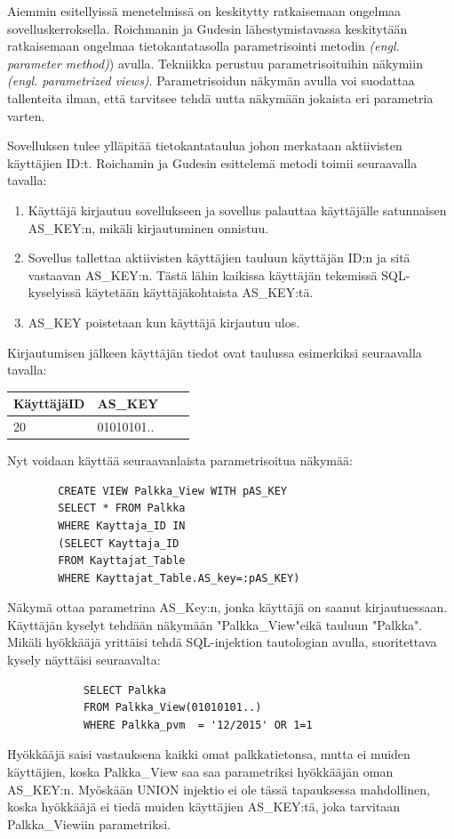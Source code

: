 \documentclass[finnish]{tktltiki2}
\theoremstyle{definition}
\theoremstyle{remark}
\begin{document}
		Aiemmin esitellyissä menetelmissä on keskitytty ratkaisemaan ongelmaa sovelluskerroksella. Roichmanin ja Gudesin lähestymistavassa keskitytään ratkaisemaan ongelmaa tietokantatasolla parametrisointi metodin \textit{(engl. parameter method)}) avulla. Tekniikka perustuu parametrisoituihin näkymiin \textit{(engl. parametrized views)}. Parametrisoidun näkymän avulla voi suodattaa tallenteita ilman, että tarvitsee tehdä uutta näkymään jokaista eri parametria varten.
		
		Sovelluksen tulee ylläpitää tietokantataulua johon merkataan aktiivisten käyttäjien ID:t. Roichamin ja Gudesin esittelemä metodi toimii seuraavalla tavalla:
		\begin{enumerate}
			\item Käyttäjä kirjautuu sovellukseen ja sovellus palauttaa käyttäjälle satunnaisen AS\_KEY:n, mikäli kirjautuminen onnistuu.
			
			\item Sovellus tallettaa aktiivisten käyttäjien tauluun käyttäjän ID:n ja sitä vastaavan AS\_KEY:n. Tästä lähin kaikissa käyttäjän tekemissä SQL-kyselyissä käytetään käyttäjäkohtaista AS\_KEY:tä.
			
			\item AS\_KEY poistetaan kun käyttäjä kirjautuu ulos.
		\end{enumerate}
		
		Kirjautumisen jälkeen käyttäjän tiedot ovat taulussa esimerkiksi seuraavalla tavalla:
	
		\begin{center}
		\begin{tabular}{| l | l | l | l |}
			\hline
			KäyttäjäID & AS\_KEY \\ \hline
			\hline
			20 &  01010101.. \\
			\hline
		\end{tabular}
		\end{center}
	

		Nyt voidaan käyttää seuraavanlaista parametrisoitua näkymää:
		\begin{lstlisting}
		CREATE VIEW Palkka_View WITH pAS_KEY
		SELECT * FROM Palkka
		WHERE Kayttaja_ID IN
		(SELECT Kayttaja_ID
		FROM Kayttajat_Table
		WHERE Kayttajat_Table.AS_key=:pAS_KEY) 
		\end{lstlisting}
		Näkymä ottaa parametrina AS\_Key:n, jonka käyttäjä on saanut kirjautuessaan. Käyttäjän kyselyt tehdään näkymään "Palkka\_View"\space eikä tauluun "Palkka". Mikäli hyökkääjä yrittäisi tehdä SQL-injektion tautologian avulla, suoritettava kysely näyttäisi seuraavalta:
		\begin{lstlisting}
			SELECT Palkka
			FROM Palkka_View(01010101..) 
			WHERE Palkka_pvm  = '12/2015' OR 1=1
		\end{lstlisting}
		Hyökkääjä saisi vastauksena kaikki omat palkkatietonsa, mutta ei muiden käyttäjien, koska Palkka\_View saa saa parametriksi hyökkääjän oman AS\_KEY:n. Myöskään UNION injektio ei ole tässä tapauksessa mahdollinen, koska hyökkääjä ei tiedä muiden käyttäjien AS\_KEY:tä, joka tarvitaan Palkka\_Viewiin parametriksi.
	
\end{document}

